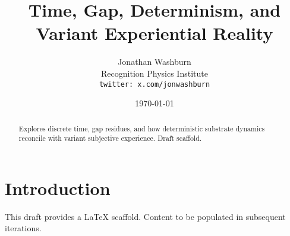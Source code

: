 \documentclass[11pt,letterpaper]{article}
\title{Time, Gap, Determinism, and Variant Experiential Reality}
\author{Jonathan Washburn\\Recognition Physics Institute\\\texttt{twitter: x.com/jonwashburn}}
\date{\today}
\begin{document}
\maketitle
\begin{abstract}
Explores discrete time, gap residues, and how deterministic substrate dynamics reconcile with variant subjective experience. Draft scaffold.
\end{abstract}
\section{Introduction}
This draft provides a LaTeX scaffold. Content to be populated in subsequent iterations.
\end{document}
